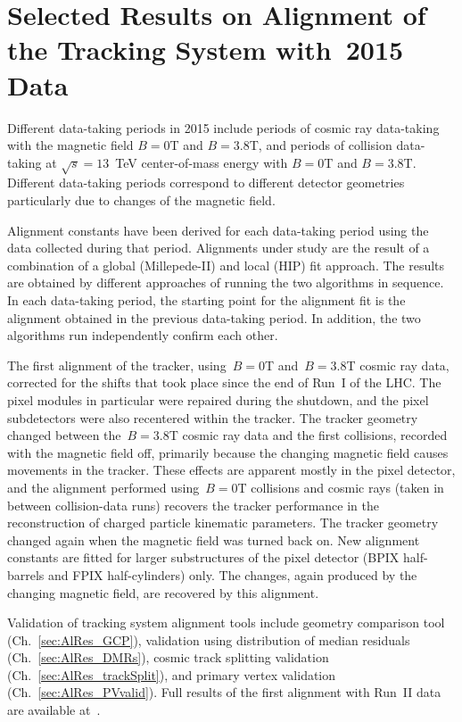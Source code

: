 \section{Selected Results on Alignment of the Tracking System with~2015 Data}
\label{sec:alignmentResults}

Different data-taking periods in 2015 include periods of cosmic ray data-taking with the magnetic field $B=0$T and $B=3.8$T, and periods of collision data-taking at $\sqrt{s}=13$~TeV center-of-mass energy with $B=0$T and $B=3.8$T. Different data-taking periods correspond to different detector geometries particularly due to changes of the magnetic field. 

Alignment constants have been derived for each data-taking period using the data collected during that period. Alignments under study are the result of a combination of a global (Millepede-II) and local (HIP) fit approach. The results are obtained by different approaches of running the two algorithms in sequence. In each data-taking period, the starting point for the alignment fit is the alignment obtained in the previous data-taking period. In addition, the two algorithms run independently confirm each other. 

The first alignment of the tracker, using~$B=0$T and~$B=3.8$T cosmic ray data, corrected for the shifts that took place since the end of Run~I of the LHC. The pixel modules in particular were repaired during the shutdown, and the pixel subdetectors were also recentered within the tracker. The tracker geometry changed between the~$B=3.8$T cosmic ray data and the first collisions, recorded with the magnetic field off, primarily because the changing magnetic field causes movements in the tracker. These effects are apparent mostly in the pixel detector, and the alignment performed using~$B=0$T collisions and cosmic rays (taken in between collision-data runs) recovers the tracker performance in the reconstruction of charged particle kinematic parameters. The tracker geometry changed again when the magnetic field was turned back on. New alignment constants are fitted for larger substructures of the pixel detector (BPIX half-barrels and FPIX half-cylinders) only. The changes, again produced by the changing magnetic field, are recovered by this alignment.

Validation of tracking system alignment tools include geometry comparison tool (Ch.~\ref{sec:AlRes_GCP}), validation using distribution of median residuals (Ch.~\ref{sec:AlRes_DMRs}), cosmic track splitting validation (Ch.~\ref{sec:AlRes_trackSplit}), and primary vertex validation (Ch.~\ref{sec:AlRes_PVvalid}). Full results of the first alignment with Run~II data are available at~\cite{ref_AlApproved_twiki}.

